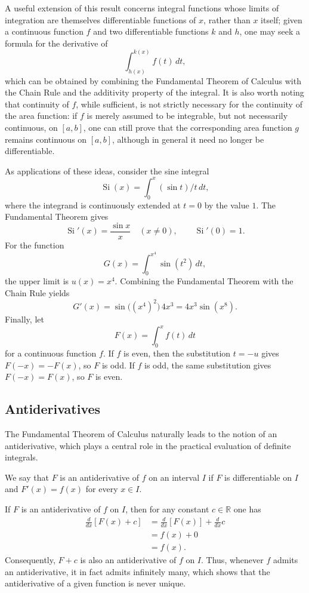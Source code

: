 A useful extension of this result concerns integral functions whose limits of integration are themselves differentiable functions of $x$, rather than $x$ itself; given a continuous function $f$ and two differentiable functions $k$ and $h$, one may seek a formula for the derivative of \[
\int_{h(x)}^{k(x)} f(t) \, dt,
\] which can be obtained by combining the Fundamental Theorem of Calculus with the Chain Rule and the additivity property of the integral. It is also worth noting that continuity of $f$, while sufficient, is not strictly necessary for the continuity of the area function: if $f$ is merely assumed to be integrable, but not necessarily continuous, on $[a,b]$, one can still prove that the corresponding area function $g$ remains continuous on $[a,b]$, although in general it need no longer be differentiable.

As applications of these ideas, consider the sine integral \[
\operatorname{Si}(x) = \int_0^x (\sin t)/t \, dt,
\] where the integrand is continuously extended at $t=0$ by the value $1$.
The Fundamental Theorem gives
\[
\operatorname{Si}'(x)=\frac{\sin x}{x}\quad(x\neq0),
\qquad \operatorname{Si}'(0)=1.
\]
For the function \[
G(x)=\int_0^{x^4} \sin(t^2) \, dt,
\] the upper limit is $u(x)=x^4$. Combining the Fundamental Theorem with
the Chain Rule yields
\[
G'(x)=\sin\bigl((x^4)^2\bigr)\,4x^3
=4x^3\sin(x^8).
\]
Finally, let \[
F(x) = \int_0^x f(t) \, dt
\] for a continuous function $f$. If $f$ is even, then the substitution
$t=-u$ gives $F(-x)=-F(x)$, so $F$ is odd. If $f$ is odd, the same
substitution gives $F(-x)=F(x)$, so $F$ is even.

\subsection{Antiderivatives}

The Fundamental Theorem of Calculus naturally leads to the notion of an antiderivative, which plays a central role in the practical evaluation of definite integrals.

\begin{definition}
We say that $F$ is an antiderivative of $f$ on an interval $I$ if $F$ is differentiable on $I$ and $F'(x) = f(x)$ for every $x \in I$.
\end{definition}

\begin{remark}
If $F$ is an antiderivative of $f$ on $I$, then for any constant $c \in \mathbb{R}$ one has
\[
\begin{aligned}
\frac{d}{dx} [F(x) + c] &= \frac{d}{dx} [F(x)] + \frac{d}{dx} c \\
&= f(x) + 0 \\
&= f(x).
\end{aligned}
\]
Consequently, $F + c$ is also an antiderivative of $f$ on $I$. Thus, whenever $f$ admits an antiderivative, it in fact admits infinitely many, which shows that the antiderivative of a given function is never unique.
\end{remark}

